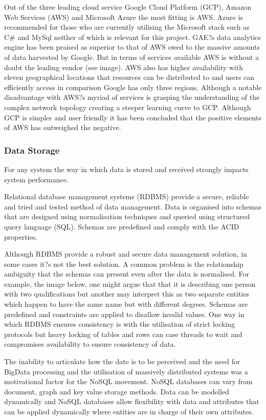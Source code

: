 \documentclass[a4paper, 11pt]{article}
\begin{document}
Out of the three leading cloud service Google Cloud Platform (GCP), Amazon Web Services (AWS) and Microsoft Azure the most fitting is AWS. Azure is recommended for those who are currently utilising the Microsoft stack such as C\# and MySql neither of which is relevant for this project. GAE?s data analytics engine has been praised as superior to that of AWS owed to the massive amounts of data harvested by Google. But in terms of services available AWS is without a doubt the leading vendor (see image).  AWS also has higher availability with eleven geographical locations that resources can be distributed to and users can efficiently access in comparison Google has only three regions. Although a notable disadvantage with AWS?s myriad of services is grasping the understanding of the complex network topology creating a steeper learning curve to GCP. Although GCP is simpler and user friendly it has been concluded that the positive elements of AWS has outweighed the negative.

\subsubsection{Data Storage}
For any system the way in which data is stored and received strongly impacts system performance. 

Relational database management systems (RDBMS) provide a secure, reliable and tried and tested method of data management. Data is organised into schemas that are designed using normalisation techniques and queried using structured query language (SQL). Schemas are predefined and comply with the ACID properties. 

Although RDBMS provide a robust and secure data management solution, in some cases it?s not the best solution. A common problem is the relationship ambiguity that the schemas can present even after the data is normalised. For example, the image below, one might argue that that it is describing one person with two qualifications but another may interpret this as two separate entities which happen to have the same name but with different degrees. Schemas are predefined and constraints are applied to disallow invalid values. One way in which RDBMS ensures consistency is with the utilisation of strict locking protocols but heavy locking of tables and rows can case threads to wait and compromises availability to ensure consistency of data. 

The inability to articulate how the date is to be perceived and the need for BigData processing and the utilisation of massively distributed systems was a motivational factor for the NoSQL movement. NoSQL databases can vary from document, graph and key value storage methods. Data can be modelled dynamically and NoSQL databases allow flexibility with data and attributes that can be applied dynamically where entities are in charge of their own attributes.
\end{document}

